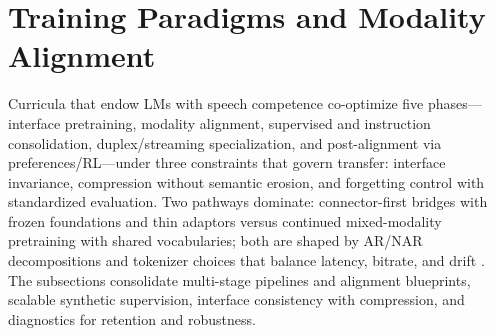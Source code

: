 \documentclass{article}
\begin{document}
\section{Training Paradigms and Modality Alignment} \label{sec:trainingparadigmsandmodalityalignment}
Curricula that endow LMs with speech competence co-optimize five phases---interface pretraining, modality alignment, supervised and instruction consolidation, duplex/streaming specialization, and post-alignment via preferences/RL---under three constraints that govern transfer: interface invariance, compression without semantic erosion, and forgetting control with standardized evaluation. Two pathways dominate: connector-first bridges with frozen foundations and thin adaptors versus continued mixed-modality pretraining with shared vocabularies; both are shaped by AR/NAR decompositions and tokenizer choices that balance latency, bitrate, and drift \cite{turetzky2024lastlanguagemodelawarespeechtokenization,wang2023slmbridgethingapbetweenspeechtextfoundat,zeng2024scalingspeechtextpretrainingsyntheticint}. The subsections consolidate multi-stage pipelines and alignment blueprints, scalable synthetic supervision, interface consistency with compression, and diagnostics for retention and robustness.
\end{document}
